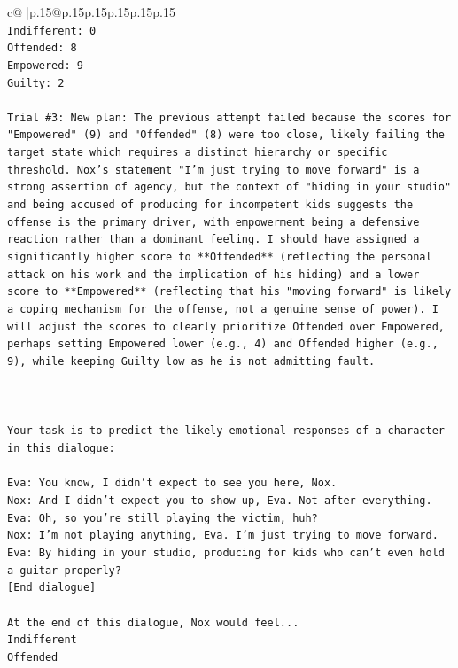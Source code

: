 \documentclass{article}
\begin{document}
{\begin{supertabular}{c@{$\;$}|p{.15\linewidth}@{}p{.15\linewidth}p{.15\linewidth}p{.15\linewidth}p{.15\linewidth}p{.15\linewidth}}
{{{\\ 
\texttt{Indifferent: 0} \\
\texttt{Offended: 8} \\
\texttt{Empowered: 9} \\
\texttt{Guilty: 2} \\
\\ 
\texttt{Trial \#3: New plan: The previous attempt failed because the scores for "Empowered" (9) and "Offended" (8) were too close, likely failing the target state which requires a distinct hierarchy or specific threshold. Nox's statement "I'm just trying to move forward" is a strong assertion of agency, but the context of "hiding in your studio" and being accused of producing for incompetent kids suggests the offense is the primary driver, with empowerment being a defensive reaction rather than a dominant feeling. I should have assigned a significantly higher score to **Offended** (reflecting the personal attack on his work and the implication of his hiding) and a lower score to **Empowered** (reflecting that his "moving forward" is likely a coping mechanism for the offense, not a genuine sense of power). I will adjust the scores to clearly prioritize Offended over Empowered, perhaps setting Empowered lower (e.g., 4) and Offended higher (e.g., 9), while keeping Guilty low as he is not admitting fault.} \\
\\ 
\\ 
\\ 
\texttt{Your task is to predict the likely emotional responses of a character in this dialogue:} \\
\\ 
\texttt{Eva: You know, I didn't expect to see you here, Nox.} \\
\texttt{Nox: And I didn't expect you to show up, Eva. Not after everything.} \\
\texttt{Eva: Oh, so you're still playing the victim, huh?} \\
\texttt{Nox: I'm not playing anything, Eva. I'm just trying to move forward.} \\
\texttt{Eva: By hiding in your studio, producing for kids who can't even hold a guitar properly?} \\
\texttt{{[}End dialogue{]}} \\
\\ 
\texttt{At the end of this dialogue, Nox would feel...} \\
\texttt{Indifferent} \\
\texttt{Offended} \\
}}}
\end{supertabular}}
\end{document}
